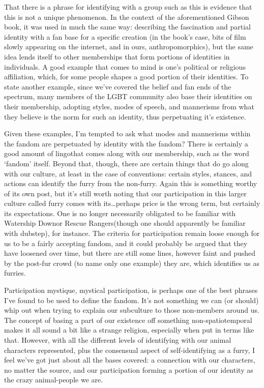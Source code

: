 That there is a phrase for identifying with a group such as this is evidence that this is not a unique phenomenon. In the context of the aforementioned Gibson book, it was used in much the same way: describing the fascination and partial identity with a fan base for a specific creation (in the book's case, bits of film slowly appearing on the internet, and in ours, anthropomorphics), but the same idea lends itself to other memberships that form portions of identities in individuals. A good example that comes to mind is one's political or religious affiliation, which, for some people shapes a good portion of their identities. To state another example, since we've covered the belief and fan ends of the spectrum, many members of the LGBT community also base their identities on their membership, adopting styles, modes of speech, and mannerisms from what they believe is the norm for such an identity, thus perpetuating it's existence.

Given these examples, I'm tempted to ask what modes and mannerisms within the fandom are perpetuated by identity with the fandom? There is certainly a good amount of lingothat comes along with our membership, such as the word `fandom' itself. Beyond that, though, there are certain things that do go along with our culture, at least in the case of conventions: certain styles, stances, and actions can identify the furry from the non-furry. Again this is something worthy of its own post, but it's still worth noting that our participation in this larger culture called furry comes with its\ldots{}perhaps price is the wrong term, but certainly its expectations. One is no longer necessarily obligated to be familiar with Watership Downor Rescue Rangers(though one should apparently be familiar with dubstep), for instance. The criteria for participation remain loose enough for us to be a fairly accepting fandom, and it could probably be argued that they have loosened over time, but there are still some lines, however faint and pushed by the post-fur crowd (to name only one example) they are, which identifies us as furries.

Participation mystique, mystical participation, is perhaps one of the best phrases I've found to be used to define the fandom. It's not something we can (or should) whip out when trying to explain our subculture to those non-members around us. The concept of basing a part of our existence off something non-spatiotemporal makes it all sound a bit like a strange religion, especially when put in terms like that. However, with all the different levels of identifying with our animal characters represented, plus the consensual aspect of self-identifying as a furry, I feel we've got just about all the bases covered: a connection with our characters, no matter the source, and our participation forming a portion of our identity as the crazy animal-people we are.
